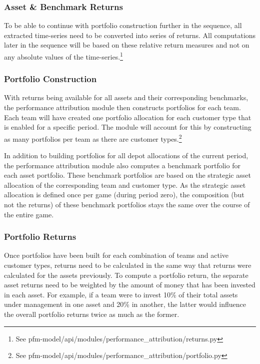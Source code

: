 \subsubsection{Asset \& Benchmark Returns}
To be able to continue with portfolio construction further in the sequence, all extracted time-series need to be converted into series of returns. All computations later in the sequence will be based on these relative return measures and not on any absolute values of the time-series.\footnote{See pfm-model/api/modules/performance\_attribution/returns.py}

\subsubsection{Portfolio Construction}
With returns being available for all assets and their corresponding benchmarks, the performance attribution module then constructs portfolios for each team. Each team will have created one portfolio allocation for each customer type that is enabled for a specific period. The module will account for this by constructing as many portfolios per team as there are customer types.\footnote{See pfm-model/api/modules/performance\_attribution/portfolio.py}

In addition to building portfolios for all depot allocations of the current period, the performance attribution module also computes a benchmark portfolio for each asset portfolio. These benchmark portfolios are based on the strategic asset allocation of the corresponding team and customer type. As the strategic asset allocation is defined once per game (during period zero), the composition (but not the returns) of these benchmark portfolios stays the same over the course of the entire game.

\subsubsection{Portfolio Returns}
Once portfolios have been built for each combination of teams and active customer types, returns need to be calculated in the same way that returns were calculated for the assets previously. To compute a portfolio return, the separate asset returns need to be weighted by the amount of money that has been invested in each asset. For example, if a team were to invest 10\% of their total assets under management in one asset and 20\% in another, the latter would influence the overall portfolio returns twice as much as the former.

